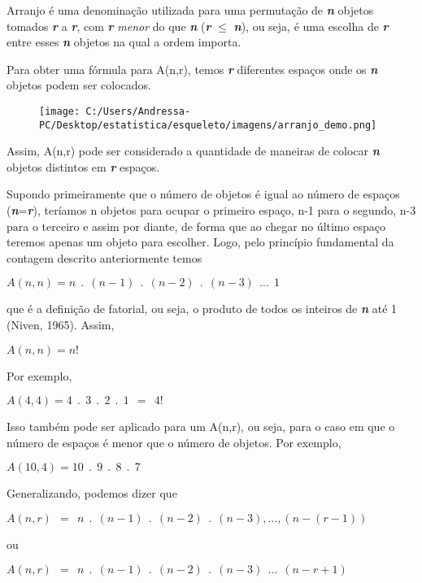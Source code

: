 Arranjo é uma denominação utilizada para uma permutação de \textbf{\textit{n}} objetos tomados \textbf{\textit{r}} a \textbf{\textit{r}}, com \textbf{\textit{r}} \textit{menor} do que \textbf{\textit{n}} (\textbf{\textit{r}} $\leq$ \textbf{\textit{n}}), ou seja, é uma escolha de \textbf{\textit{r}} entre esses \textbf{\textit{n}} objetos na qual a ordem importa.

Para obter uma fórmula para A(n,r), temos \textbf{\textit{r}} diferentes espaços onde os \textbf{\textit{n}} objetos podem ser colocados.

\begin{figure}[H]
	\centering

	\texttt{[image: C:/Users/Andressa-PC/Desktop/estatistica/esqueleto/imagens/arranjo\_demo.png]}

\end{figure}

Assim, A(n,r) pode ser considerado a quantidade de maneiras de colocar \textbf{\textit{n}} objetos distintos em \textbf{\textit{r}} espaços.

Supondo primeiramente que o número de objetos é igual ao número de espaços (\textbf{\textit{n}}=\textbf{\textit{r}}), teríamos n objetos para ocupar o primeiro espaço, n-1 para o segundo, n-3 para o terceiro e assim por diante, de forma que ao chegar no último espaço teremos apenas um objeto para escolher.
Logo, pelo princípio fundamental da contagem descrito anteriormente temos
\begin{center}
	$A(n,n)=n\ \ .\ \ (n-1)\ \ .\ \ (n-2)\ \ .\ \ (n-3)\ \ ...\ \ 1$
\end{center}

\noindent 
que é a definição de fatorial, ou seja, o produto de todos os inteiros de \textbf{\textit{n}} até 1 (Niven, 1965). Assim,
\begin{center}
	$A(n,n)=n!$
\end{center}

\noindent 
Por exemplo, 
\begin{center}
	$A(4,4)= 4\ \ .\ \ 3\ \ .\ \ 2\ \ .\ \ 1\ \ =\ \ 4!$
\end{center}
Isso também pode ser aplicado para um A(n,r), ou seja, para o caso em que o número de espaços é menor que o número de objetos. Por exemplo,
\begin{center}
	$A(10,4)= 10\ \ .\ \ 9\ \ .\ \ 8\ \ .\ \ 7$
\end{center}
Generalizando, podemos dizer que
\begin{center}
	$A(n,r)\ \ =\ \ n\ \ .\ \ (n-1)\ \ .\ \ (n-2)\ \ .\ \ (n-3),...,(n-(r-1))$

ou

	$A(n,r)\ \ =\ \ n\ \ .\ \ (n-1)\ \ .\ \ (n-2)\ \ .\ \ (n-3)\ \ ...\ \ (n-r+1)$
\end{center}

